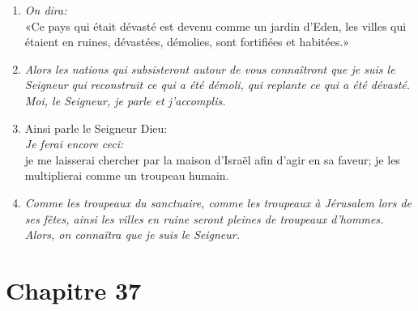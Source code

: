 \begin{enumerate}[leftmargin=\psleftmargin, labelsep = \pslabelsep, label={\arabic*}, font=\color{\pscolor}\small\textsuperscript, parsep=0em, itemsep=0em, topsep=0em ]
{          au lieu d’être un désert aux yeux de tous les passants.}
  \item {}\textit{On dira:} \\
        «Ce pays qui était dévasté \brk
        est devenu comme un jardin d’Eden, \brk
        les villes qui étaient en ruines, dévastées, démolies, \brk
        sont fortifiées et habitées.»
  \item {}\textit{Alors les nations qui subsisteront autour de vous \brk
          connaîtront que je suis le Seigneur \brk
          qui reconstruit ce qui a été démoli, \brk
          qui replante ce qui a été dévasté. \brk
          Moi, le Seigneur, je parle et j’accomplis.} \parSpace
  \item {}Ainsi parle le Seigneur Dieu: \\
        \textit{Je ferai encore ceci:} \\
        je me laisserai chercher par la maison d’Israël afin d’agir en sa faveur; \brk
        je les multiplierai comme un troupeau humain.
  \item {}\textit{Comme les troupeaux du sanctuaire, \brk
          comme les troupeaux à Jérusalem lors de ses fêtes, \brk
          ainsi les villes en ruine seront pleines de troupeaux d’hommes. \brk
          Alors, on connaîtra que je suis le Seigneur.}
\end{enumerate}
\newpage

\section*{Chapitre 37}
